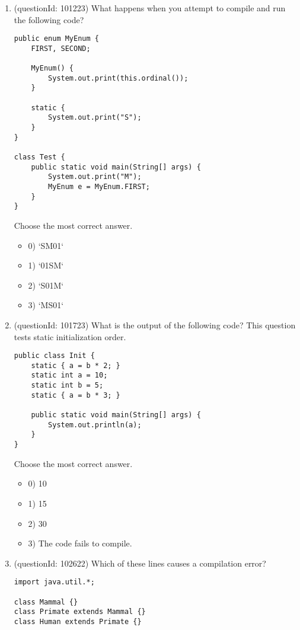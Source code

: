 \documentclass[12pt]{article}
\begin{document}
\begin{enumerate}[label=(\arabic*)]
\begin{itemize}
\end{itemize}
\item (questionId: 101223) What happens when you attempt to compile and run the following code?
\begin{verbatim}
public enum MyEnum {
    FIRST, SECOND;
    
    MyEnum() {
        System.out.print(this.ordinal());
    }
    
    static {
        System.out.print("S");
    }
}

class Test {
    public static void main(String[] args) {
        System.out.print("M");
        MyEnum e = MyEnum.FIRST;
    }
}
\end{verbatim}
Choose the most correct answer. 
\begin{itemize}
\item 0) `SM01`

\item 1) `01SM`

\item 2) `S01M`

\item 3) `MS01`

\end{itemize}
\item (questionId: 101723) What is the output of the following code? This question tests static initialization order.\n\begin{verbatim}
public class Init {
    static { a = b * 2; }
    static int a = 10;
    static int b = 5;
    static { a = b * 3; }

    public static void main(String[] args) {
        System.out.println(a);
    }
}
\end{verbatim}
Choose the most correct answer. 
\begin{itemize}
\item 0) 10

\item 1) 15

\item 2) 30

\item 3) The code fails to compile.

\end{itemize}
\item (questionId: 102622) Which of these lines causes a compilation error?\begin{verbatim}
import java.util.*;

class Mammal {}
class Primate extends Mammal {}
class Human extends Primate {}


\end{verbatim}
\end{enumerate}
\end{document}
